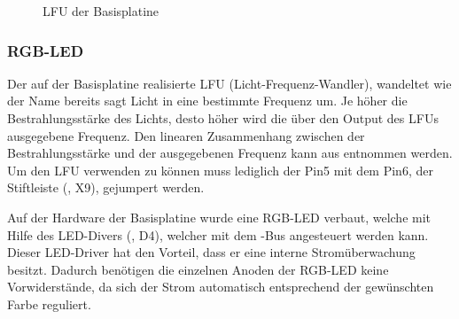 \begin{figure}[htb]
    \centering
    \qquad
    \qquad
    \caption[LFU der Basisplatine]{LFU der \gls{Basisplatine}}
    \label{fig:basisplatine-lfu}
\end{figure}

\subsubsection{RGB-LED}
Der auf der \gls{Basisplatine} realisierte LFU (Licht-Frequenz-Wandler), wandeltet wie der Name bereits sagt Licht in eine bestimmte Frequenz um. Je höher die Bestrahlungsstärke des Lichts, desto höher wird die über den Output des LFUs ausgegebene Frequenz. Den linearen Zusammenhang zwischen der Bestrahlungsstärke und der ausgegebenen Frequenz kann aus  entnommen werden. Um den LFU verwenden zu können muss lediglich der Pin5 mit dem Pin6, der Stiftleiste (, X9), gejumpert werden.

Auf der Hardware der \gls{Basisplatine} wurde eine RGB-LED verbaut, welche mit Hilfe des LED-Divers (, D4), welcher mit dem \IIC{}-Bus angesteuert werden kann. Dieser LED-Driver hat den Vorteil, dass er eine interne Stromüberwachung besitzt. Dadurch benötigen die einzelnen Anoden der RGB-LED keine Vorwiderstände, da sich der Strom automatisch entsprechend der gewünschten Farbe reguliert.

